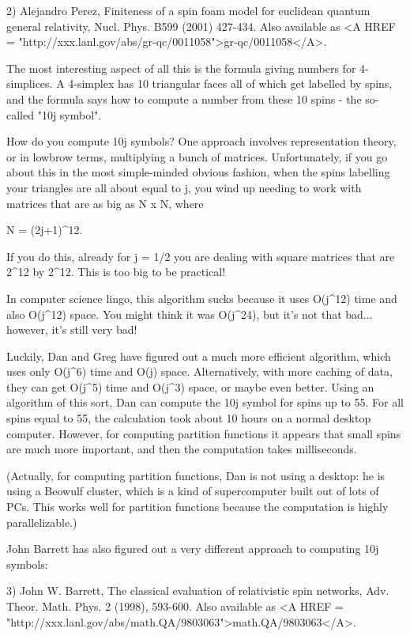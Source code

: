 2) Alejandro Perez, Finiteness of a spin foam model for euclidean 
quantum general relativity, Nucl. Phys. B599 (2001) 427-434. 
Also available as
<A HREF = "http://xxx.lanl.gov/abs/gr-qc/0011058">gr-qc/0011058</A>.


The most interesting aspect of all this is the formula giving numbers for 
4-simplices.  A 4-simplex has 10 triangular faces all of which get labelled 
by spins, and the formula says how to compute a number from these 10 spins - 
the so-called "10j symbol".

How do you compute 10j symbols?  One approach involves representation theory,
or in lowbrow terms, multiplying a bunch of matrices.  Unfortunately, if you 
go about this in the most simple-minded obvious fashion, when the spins 
labelling your triangles are all about equal to j, you wind up needing to 
work with matrices that are as big as N x N, where

N = (2j+1)^{12}.

If you do this, already for j = 1/2 you are dealing with square matrices 
that are 2^{12} by 2^{12}.  This is too big to be practical!

In computer science lingo, this algorithm sucks because it uses
O(j^{12}) time and also O(j^{12}) space.  You might
think it was O(j^{24}), but it's not that bad... however, it's
still very bad!  


Luckily, Dan and Greg have figured out a much more efficient
algorithm, which uses only O(j^{6}) time and O(j) space.
Alternatively, with more caching of data, they can get
O(j^{5}) time and O(j^{3}) space, or maybe even
better.  Using an algorithm of this sort, Dan can compute the 10j
symbol for spins up to 55.  For all spins equal to 55, the calculation
took about 10 hours on a normal desktop computer.  However, for
computing partition functions it appears that small spins are much
more important, and then the computation takes milliseconds.

(Actually, for computing partition functions, Dan is not using a desktop: 
he is using a Beowulf cluster, which is a kind of supercomputer built out 
of lots of PCs.  This works well for partition functions because the 
computation is highly parallelizable.)

John Barrett has also figured out a very different approach to computing 
10j symbols:

3) John W. Barrett, The classical evaluation of relativistic spin networks, 
Adv. Theor. Math. Phys. 2 (1998), 593-600.  Also available as 
<A HREF = "http://xxx.lanl.gov/abs/math.QA/9803063">math.QA/9803063</A>.

